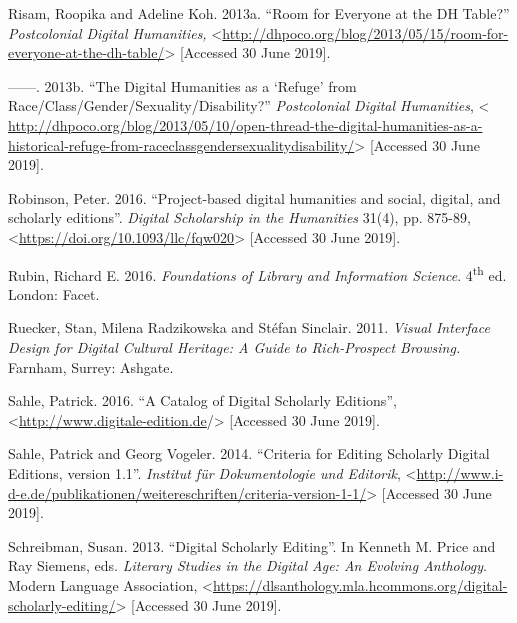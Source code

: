 \begin{paper}
\begin{flushleft}
Risam, Roopika and Adeline Koh. 2013a. ``Room for Everyone at the DH
Table?'' \emph{Postcolonial Digital Humanities,}
\textless{}\href{http://dhpoco.org/blog/2013/05/15/room-for-everyone-at-the-dh-table/}{http://dhpoco.org/blog/2013/05/15/room-for-everyone-at-the-dh-table/}\textgreater{} {[}Accessed 30 June 2019{]}.

------. 2013b. ``The Digital Humanities as a `Refuge' from
Race/Class/Gender/Sexuality/Disability?'' \emph{Postcolonial Digital
Humanities}, \textless{}
\href{http://dhpoco.org/blog/2013/05/10/open-thread-the-digital-humanities-as-a-historical-refuge-from-raceclassgendersexualitydisability/}{http://dhpoco.org/blog/2013/05/10/open-thread-the-digital-humanities-as-a-historical-refuge-from-raceclassgendersexualitydisability/}\textgreater{}
{[}Accessed 30 June 2019{]}.

Robinson, Peter. 2016. ``Project-based digital humanities and social,
digital, and scholarly editions''. \emph{Digital Scholarship in the
Humanities} 31(4), pp. 875-89,
\textless{}\href{https://doi.org/10.1093/llc/fqw020}{https://doi.org/10.1093/llc/fqw020}\textgreater{} {[}Accessed
30 June 2019{]}.

Rubin, Richard E. 2016. \emph{Foundations of Library and Information
Science}. 4\textsuperscript{th} ed. London: Facet.

Ruecker, Stan, Milena Radzikowska and Stéfan Sinclair. 2011.
\emph{Visual Interface Design for Digital Cultural Heritage: A Guide to
Rich-Prospect Browsing.} Farnham, Surrey: Ashgate.

Sahle, Patrick. 2016. ``A Catalog of Digital Scholarly Editions'',
\textless{}\href{http://www.digitale-edition.de}{http://www.digitale-edition.de}/\textgreater{}
{[}Accessed 30 June 2019{]}.

Sahle, Patrick and Georg Vogeler. 2014. ``Criteria for Editing Scholarly
Digital Editions, version 1.1''. \emph{Institut für Dokumentologie und
Editorik},
\textless{}\href{http://www.i-d-e.de/publikationen/weitereschriften/criteria-version-1-1/}{http://www.i-d-e.de/publikationen/weitereschriften/criteria-version-1-1/}\textgreater{}
{[}Accessed 30 June 2019{]}.

Schreibman, Susan. 2013. ``Digital Scholarly Editing''. In Kenneth M.
Price and Ray Siemens, eds. \emph{Literary Studies in the Digital Age:
An Evolving Anthology}. Modern Language Association,
\textless{}\href{https://dlsanthology.mla.hcommons.org/digital-scholarly-editing/}{https://dlsanthology.mla.hcommons.org/digital-scholarly-editing/}\textgreater{}
{[}Accessed 30 June 2019{]}.


\end{flushleft}
\end{paper}
